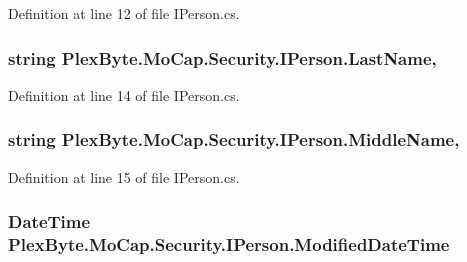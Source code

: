 Definition at line 12 of file I\+Person.\+cs.

\subsubsection[{\texorpdfstring{Last\+Name}{LastName}}]{\setlength{\rightskip}{0pt plus 5cm}string Plex\+Byte.\+Mo\+Cap.\+Security.\+I\+Person.\+Last\+Name\hspace{0.3cm}{\ttfamily [get]}, {\ttfamily [set]}}\hypertarget{interface_plex_byte_1_1_mo_cap_1_1_security_1_1_i_person_ab4e080812cf1517ef2e3a56295b0965d}{}\label{interface_plex_byte_1_1_mo_cap_1_1_security_1_1_i_person_ab4e080812cf1517ef2e3a56295b0965d}


Definition at line 14 of file I\+Person.\+cs.

\subsubsection[{\texorpdfstring{Middle\+Name}{MiddleName}}]{\setlength{\rightskip}{0pt plus 5cm}string Plex\+Byte.\+Mo\+Cap.\+Security.\+I\+Person.\+Middle\+Name\hspace{0.3cm}{\ttfamily [get]}, {\ttfamily [set]}}\hypertarget{interface_plex_byte_1_1_mo_cap_1_1_security_1_1_i_person_aa42342d7ddfa8f866c9b64d655e04f26}{}\label{interface_plex_byte_1_1_mo_cap_1_1_security_1_1_i_person_aa42342d7ddfa8f866c9b64d655e04f26}


Definition at line 15 of file I\+Person.\+cs.

\subsubsection[{\texorpdfstring{Modified\+Date\+Time}{ModifiedDateTime}}]{\setlength{\rightskip}{0pt plus 5cm}Date\+Time Plex\+Byte.\+Mo\+Cap.\+Security.\+I\+Person.\+Modified\+Date\+Time\hspace{0.3cm}{\ttfamily [get]}}\hypertarget{interface_plex_byte_1_1_mo_cap_1_1_security_1_1_i_person_a22533c8d75c245c3d5c4488e4e461751}{}\label{interface_plex_byte_1_1_mo_cap_1_1_security_1_1_i_person_a22533c8d75c245c3d5c4488e4e461751}


